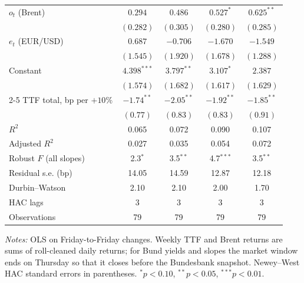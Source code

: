 \documentclass[11pt,a4paper]{article}
\begin{document}
\begin{table}[htbp]
\begin{tabular}{@{}l*{4}{c}@{}}
$o_t$ (Brent) & $0.294$ & $0.486$ & $0.527^{*}$ & $0.625^{**}$\\
 & $(0.282)$ & $(0.305)$ & $(0.280)$ & $(0.285)$\\
$e_t$ (EUR/USD) & $0.687$ & $-0.706$ & $-1.670$ & $-1.549$\\
 & $(1.545)$ & $(1.920)$ & $(1.678)$ & $(1.288)$\\
Constant & $4.398^{***}$ & $3.797^{**}$ & $3.107^{*}$ & $2.387$\\
 & $(1.574)$ & $(1.682)$ & $(1.617)$ & $(1.629)$\\
\cmidrule(l){2-5}
TTF total, bp per $+10\%$ & $-1.74^{**}$ & $-2.05^{**}$ & $-1.92^{**}$ & $-1.85^{**}$\\
 & $(0.77)$ & $(0.83)$ & $(0.83)$ & $(0.91)$\\
$R^2$ & 0.065 & 0.072 & 0.090 & 0.107\\
Adjusted $R^2$ & 0.027 & 0.035 & 0.054 & 0.072\\
Robust $F$ (all slopes) & 2.3$^{*}$ & 3.5$^{**}$ & 4.7$^{***}$ & 3.5$^{**}$\\
Residual s.e. (bp) & 14.05 & 14.59 & 12.87 & 12.18\\
Durbin--Watson & 2.10 & 2.10 & 2.00 & 1.70\\
HAC lags & 3 & 3 & 3 & 3\\
Observations & 79 & 79 & 79 & 79\\
\bottomrule
\end{tabular}
\par\vspace{4pt}\begin{minipage}{0.94\textwidth}\scriptsize\textit{Notes:} OLS on Friday-to-Friday changes. Weekly TTF and Brent returns are sums of roll-cleaned daily returns; for Bund yields and slopes the market window ends on Thursday so that it closes before the Bundesbank snapshot. Newey--West HAC standard errors in parentheses. $^{*}p<0.10$, $^{**}p<0.05$, $^{***}p<0.01$.\end{minipage}
\end{table}
\end{document}
